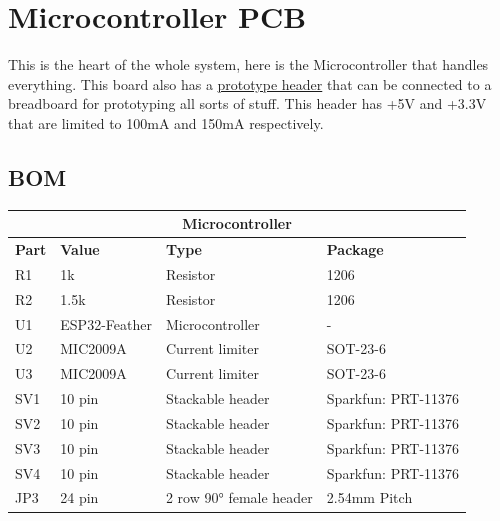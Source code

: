 \documentclass{article}
\begin{document}
 \newpage
 \section{Microcontroller PCB}
 This is the heart of the whole system, here is the Microcontroller that handles everything.
This board also has a  \hyperref[fig: pinout]{prototype header} that can be connected to a breadboard for prototyping all sorts of stuff.
This header has +5V and +3.3V that are limited to 100mA and 150mA respectively.
  \subsection{BOM}
 \begin{center}
    \begin{tabular}{ |m{2em}|m{7em}|m{7em}|m{7em}|}
    \hline
	 \multicolumn{4}{|c|}{\textbf{Microcontroller}} \\
	 \hline
       \textbf{Part} & \textbf{Value} & \textbf{Type} & \textbf{Package} \\ \hline
	R1 & 1k & Resistor & 1206 \\ \hline
	R2 & 1.5k & Resistor & 1206 \\ \hline
	U1 & ESP32-Feather & Microcontroller & -  \\ \hline
	U2 & MIC2009A & Current limiter & SOT-23-6 \\ \hline
	U3 & MIC2009A & Current limiter & SOT-23-6 \\ \hline
	SV1 & 10 pin & Stackable header & Sparkfun: PRT-11376 \\ \hline
	SV2 & 10 pin & Stackable header & Sparkfun: PRT-11376 \\ \hline
	SV3 & 10 pin & Stackable header & Sparkfun: PRT-11376 \\ \hline
	SV4 & 10 pin & Stackable header & Sparkfun: PRT-11376 \\ \hline
	JP3  & 24 pin & 2 row 90° female header & 2.54mm Pitch \\ \hline
    \end{tabular}
     \end{center}
 \newpage
 
\end{document}
